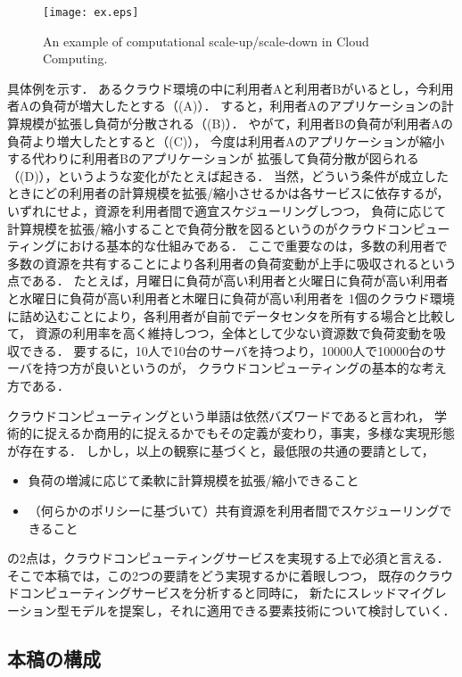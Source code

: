 \documentclass[10pt]{jsarticle}
\begin{document}
\begin{figure}
  \centering
  \texttt{[image: ex.eps]}
  \caption{An example of computational scale-up/scale-down in Cloud Computing.}
  \label{fig:ex}
\end{figure}

具体例を示す．
あるクラウド環境の中に利用者Aと利用者Bがいるとし，今利用者Aの負荷が増大したとする（(A)）．
すると，利用者Aのアプリケーションの計算規模が拡張し負荷が分散される（(B)）．
やがて，利用者Bの負荷が利用者Aの負荷より増大したとすると（(C)），
今度は利用者Aのアプリケーションが縮小する代わりに利用者Bのアプリケーションが
拡張して負荷分散が図られる（(D)），というような変化がたとえば起きる．
当然，どういう条件が成立したときにどの利用者の計算規模を拡張/縮小させるかは各サービスに依存するが，
いずれにせよ，資源を利用者間で適宜スケジューリングしつつ，
負荷に応じて計算規模を拡張/縮小することで負荷分散を図るというのがクラウドコンピューティングにおける基本的な仕組みである．
ここで重要なのは，多数の利用者で多数の資源を共有することにより各利用者の負荷変動が上手に吸収されるという点である．
たとえば，月曜日に負荷が高い利用者と火曜日に負荷が高い利用者と水曜日に負荷が高い利用者と木曜日に負荷が高い利用者を
1個のクラウド環境に詰め込むことにより，各利用者が自前でデータセンタを所有する場合と比較して，
資源の利用率を高く維持しつつ，全体として少ない資源数で負荷変動を吸収できる．
要するに，10人で10台のサーバを持つより，10000人で10000台のサーバを持つ方が良いというのが，
クラウドコンピューティングの基本的な考え方である\cite{t25}．

クラウドコンピューティングという単語は依然バズワードであると言われ，
学術的に捉えるか商用的に捉えるかでもその定義が変わり，事実，多様な実現形態が存在する\cite{t10,t11}．
しかし，以上の観察に基づくと，最低限の共通の要請として，
\begin{itemize}
\item 負荷の増減に応じて柔軟に計算規模を拡張/縮小できること
\item （何らかのポリシーに基づいて）共有資源を利用者間でスケジューリングできること
\end{itemize}
の2点は，クラウドコンピューティングサービスを実現する上で必須と言える．
そこで本稿では，この2つの要請をどう実現するかに着眼しつつ，
既存のクラウドコンピューティングサービスを分析すると同時に，
新たにスレッドマイグレーション型モデルを提案し，それに適用できる要素技術について検討していく．

\subsection{本稿の構成}
\end{document}
